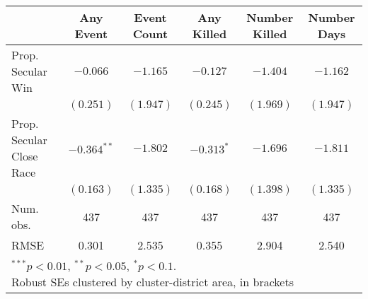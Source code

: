 
\begin{tabular}{l c c c c c }
\hline
 & Any Event & Event Count & Any Killed & Number Killed & Number Days \\
\hline
Prop. Secular Win        & $-0.066$      & $-1.165$  & $-0.127$     & $-1.404$  & $-1.162$  \\
                         & $(0.251)$     & $(1.947)$ & $(0.245)$    & $(1.969)$ & $(1.947)$ \\
Prop. Secular Close Race & $-0.364^{**}$ & $-1.802$  & $-0.313^{*}$ & $-1.696$  & $-1.811$  \\
                         & $(0.163)$     & $(1.335)$ & $(0.168)$    & $(1.398)$ & $(1.335)$ \\
\hline
Num. obs.                & 437           & 437       & 437          & 437       & 437       \\
RMSE                     & 0.301         & 2.535     & 0.355        & 2.904     & 2.540     \\
\hline
\multicolumn{6}{l}{\scriptsize{\parbox{.4\linewidth}{\vspace{2pt}$^{***}p<0.01$, $^{**}p<0.05$, $^*p<0.1$. \\
       Robust SEs clustered by cluster-district area, in brackets}}}
\end{tabular}
